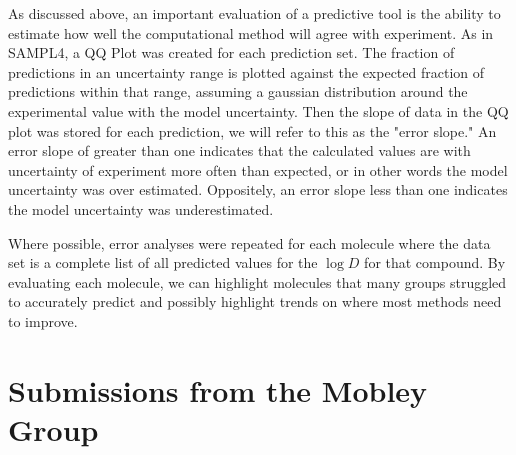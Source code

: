 As discussed above, an important evaluation of a predictive tool is the ability to estimate how well the computational method will agree with experiment. %
As in SAMPL4, a QQ Plot %
was created for each prediction set. %
The fraction of predictions in an uncertainty range is plotted against the expected fraction of predictions within that range, assuming a gaussian distribution around the experimental value with the model uncertainty. %
Then the slope of data in the QQ plot was stored for each prediction, we will refer to this as the "error slope." %
An error slope of greater than one indicates that the calculated values are with uncertainty of experiment more often than expected, or in other words the model uncertainty was over estimated. 
Oppositely, an error slope less than one indicates the model uncertainty was underestimated. %

Where possible, error analyses were repeated for each molecule where the data set is a complete list of all predicted values for the $\log D$ for that compound.  %
By evaluating each molecule, we can highlight molecules that many groups struggled to accurately predict and possibly highlight trends on where most methods need to improve. 


\section{Submissions from the Mobley Group} %
\label{methods:1}

